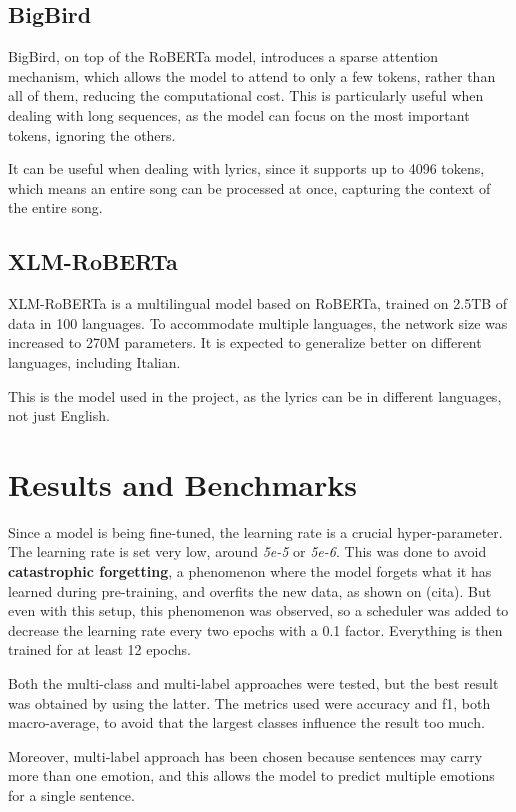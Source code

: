 \documentclass[11pt]{article}
\begin{document}
\subsection{BigBird}

BigBird, on top of the RoBERTa model, introduces a sparse attention mechanism, which allows the model to attend to only a few tokens, rather than all of them, reducing the computational cost. This is particularly useful when dealing with long sequences, as the model can focus on the most important tokens, ignoring the others.

It can be useful when dealing with lyrics, since it supports up to 4096 tokens, which means an entire song can be processed at once, capturing the context of the entire song.

\subsection{XLM-RoBERTa}

XLM-RoBERTa is a multilingual model based on RoBERTa, trained on 2.5TB of data in 100 languages. To accommodate multiple languages, the network size was increased to 270M parameters. It is expected to generalize better on different languages, including Italian.

This is the model used in the project, as the lyrics can be in different languages, not just English.

\section{Results and Benchmarks}

Since a model is being fine-tuned, the learning rate is a crucial hyper-parameter. The learning rate is set very low, around \textit{5e-5} or \textit{5e-6}. This was done to avoid \textbf{catastrophic forgetting}, a phenomenon where the model forgets what it has learned during pre-training, and overfits the new data, as shown on (cita). But even with this setup, this phenomenon was observed, so a scheduler was added to decrease the learning rate every two epochs with a 0.1 factor. Everything is then trained for at least 12 epochs.

Both the multi-class and multi-label approaches were tested, but the best result was obtained by using the latter. The metrics used were accuracy and f1, both macro-average, to avoid that the largest classes influence the result too much.

Moreover, multi-label approach has been chosen because sentences may carry more than one emotion, and this allows the model to predict multiple emotions for a single sentence.
\end{document}
